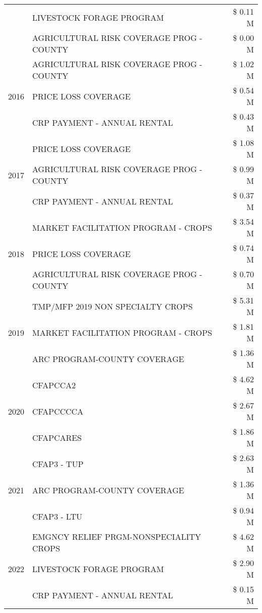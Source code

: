 \begin{tabular}{llr}
 & LIVESTOCK FORAGE PROGRAM & \$ 0.11 M \\
 & AGRICULTURAL RISK COVERAGE PROG - COUNTY & \$ 0.00 M \\
\cline{1-3}
\multirow[t]{3}{*}{2016} & AGRICULTURAL RISK COVERAGE PROG - COUNTY & \$ 1.02 M \\
 & PRICE LOSS COVERAGE & \$ 0.54 M \\
 & CRP PAYMENT - ANNUAL RENTAL & \$ 0.43 M \\
\cline{1-3}
\multirow[t]{3}{*}{2017} & PRICE LOSS COVERAGE & \$ 1.08 M \\
 & AGRICULTURAL RISK COVERAGE PROG - COUNTY & \$ 0.99 M \\
 & CRP PAYMENT - ANNUAL RENTAL & \$ 0.37 M \\
\cline{1-3}
\multirow[t]{3}{*}{2018} & MARKET FACILITATION PROGRAM - CROPS & \$ 3.54 M \\
 & PRICE LOSS COVERAGE & \$ 0.74 M \\
 & AGRICULTURAL RISK COVERAGE PROG - COUNTY & \$ 0.70 M \\
\cline{1-3}
\multirow[t]{3}{*}{2019} & TMP/MFP 2019 NON SPECIALTY CROPS & \$ 5.31 M \\
 & MARKET FACILITATION PROGRAM - CROPS & \$ 1.81 M \\
 & ARC PROGRAM-COUNTY COVERAGE & \$ 1.36 M \\
\cline{1-3}
\multirow[t]{3}{*}{2020} & CFAPCCA2 & \$ 4.62 M \\
 & CFAPCCCCA & \$ 2.67 M \\
 & CFAPCARES & \$ 1.86 M \\
\cline{1-3}
\multirow[t]{3}{*}{2021} & CFAP3 - TUP & \$ 2.63 M \\
 & ARC PROGRAM-COUNTY COVERAGE & \$ 1.36 M \\
 & CFAP3 - LTU & \$ 0.94 M \\
\cline{1-3}
\multirow[t]{3}{*}{2022} & EMGNCY RELIEF PRGM-NONSPECIALITY CROPS & \$ 4.62 M \\
 & LIVESTOCK FORAGE PROGRAM & \$ 2.90 M \\
 & CRP PAYMENT - ANNUAL RENTAL & \$ 0.15 M \\
\cline{1-3}
\bottomrule
\end{tabular}
